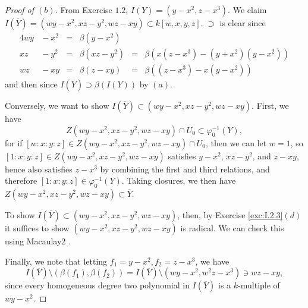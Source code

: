 \documentclass[10pt]{article}
\theoremstyle{definition}
\theoremstyle{remark}
\numberwithin{equation}{section}
\numberwithin{figure}{subsubsection}
\begin{document}
\begin{proof}[Proof of $(b)$]
  From Exercise $1.2$, $I(Y) = (y-x^2, z-x^3)$.
  We claim $I(\overline{Y}) = (wy-x^2,xz-y^2,wz-xy) \subset k[w,x,y,z]$.
  $\supset$ is clear since
  \begin{alignat*}{4}
    wy &{}- x^2 &{}={}& \beta(y-x^2)\\
    xz &{}- y^2 &{}={}& \beta(xz-y^2) &{}={}& \beta(x(z-x^3)-(y+x^2)(y-x^2))\\
    wz &{}- xy  &{}={}& \beta(z-xy)   &{}={}& \beta((z-x^3) - x(y-x^2))
  \end{alignat*}
  and then since $I(\overline{Y}) \supset \beta(I(Y))$ by $(a)$.
  \par Conversely, we want to show $I(\overline{Y}) \subset
  (wy-x^2,xz-y^2,wz-xy)$. First, we have
  \begin{equation*}
    Z(wy-x^2,xz-y^2,wz-xy) \cap U_0 \subset \varphi_0^{-1}(Y),
  \end{equation*}
  for if $[w:x:y:z] \in Z(wy-x^2,xz-y^2,wz-xy) \cap U_0$, then we can let $w=1$,
  so $[1:x:y:z] \in Z(wy-x^2,xz-y^2,wz-xy)$ satisfies $y-x^2$, $xz - y^2$, and
  $z - xy$, hence also satisfies $z - x^3$ by combining the first and third
  relations, and therefore $[1:x:y:z] \in 
  \varphi_0^{-1}(Y)$. Taking closures, we then have $Z(wy-x^2,xz-y^2,wz-xy)
  \subset \overline{Y}$.
  \par To show $I(\overline{Y}) \subset
  (wy-x^2,xz-y^2,wz-xy)$, then, by Exercise \ref{exc:I.2.3}$(d)$ it suffices to
  show $(wy-x^2,xz-y^2,wz-xy)$ is radical. We can check this using Macaulay2
  \cite{M2}.
  \par Finally, we note that letting $f_1 = y-x^2,f_2 = z-x^3$, we have
  \[I(\overline{Y}) \setminus (\beta(f_1),\beta(f_2)) =
    I(\overline{Y}) \setminus (wy-x^2,w^2z-x^3) \ni wz-xy,\]
  since every homogeneous degree two polynomial in $I(\overline{Y})$ is a
  $k$-multiple of $wy-x^2$.
\end{proof}
\end{document}
